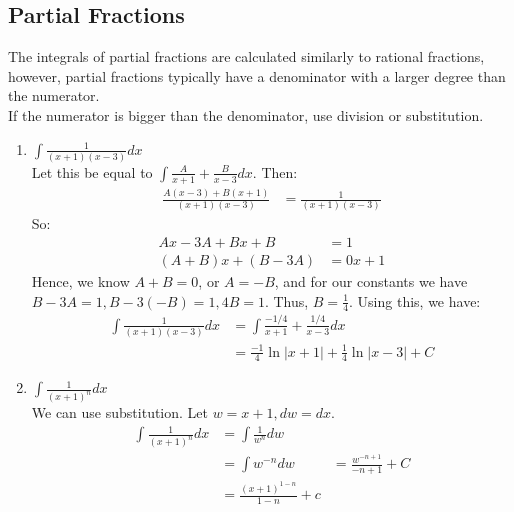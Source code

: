 \documentclass{article}
\begin{document}
\subsection{Partial Fractions}
The integrals of partial fractions are calculated similarly to rational fractions, however, partial fractions typically have a denominator with a larger degree than the numerator.\\
If the numerator is bigger than the denominator, use division or substitution.
\begin{enumerate}
    \item $\int \frac{1}{(x+1)(x-3)} dx$\\
    Let this be equal to $\int \frac{A}{x+1} + \frac{B}{x-3}dx$. Then:
    \begin{align*}
        \frac{A(x-3) + B(x+1)}{(x+1)(x-3)} & = \frac{1}{(x+1)(x-3)}
    \end{align*}
    So:
    \begin{align*}
        Ax - 3A + Bx + B & = 1\\
        (A+B)x + (B-3A) & = 0x + 1
    \end{align*}
    Hence, we know $A+B = 0$, or $A= -B$, and for our constants we have $B - 3A = 1, B-3(-B) = 1, 4B = 1$. Thus, $B=\frac{1}{4}$. Using this, we have:
    \begin{align*}
        \int \frac{1}{(x+1)(x-3)}dx & = \int \frac{-1/4}{x+1} + \frac{1/4}{x-3} dx\\
        & = \frac{-1}{4} \ln |x+1| + \frac{1}{4} \ln |x-3| + C
    \end{align*}
    
    \item $\int \frac{1}{(x+1)^n} dx$\\
    We can use substitution. Let $w = x+1, dw = dx$.
    \begin{align*}
        \int \frac{1}{(x+1)^n} dx & = \int \frac{1}{w^n} dw\\
        & = \int w^{-n}dw & = \frac{w^{-n+1}}{-n+1} + C\\
        & = \frac{(x+1)^{1-n}}{1-n} +c
    \end{align*}
    

\end{enumerate}
\end{document}

